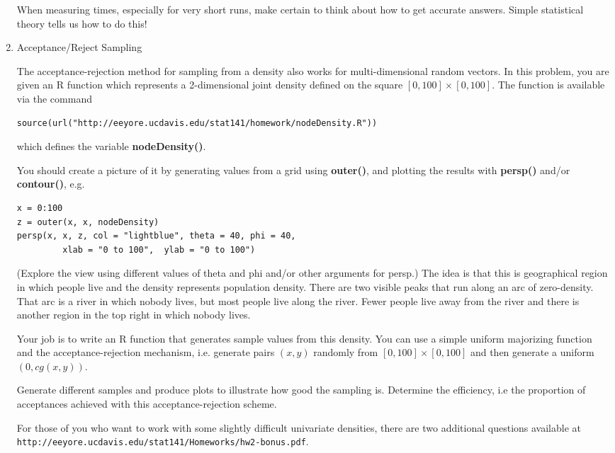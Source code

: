 \documentclass[11pt]{article}
\def\SFunction#1{\textbf{#1()}}
\begin{document}
\begin{enumerate}
 When measuring times, especially for very short runs, 
 make certain to think about how to get accurate answers.
 Simple statistical theory tells us how to do this!


\item Acceptance/Reject Sampling

  The acceptance-rejection method for sampling from a density also works 
  for multi-dimensional random vectors.  In this problem, you are
  given an R function which represents a 2-dimensional joint density
  defined on the square $[0, 100] \times [0, 100]$.  
  The function is available via the command
\begin{verbatim}
source(url("http://eeyore.ucdavis.edu/stat141/homework/nodeDensity.R"))
\end{verbatim}
 which defines the variable \SFunction{nodeDensity}.

 You should create a picture of it by generating values from a grid
 using \SFunction{outer}, and plotting the results with
 \SFunction{persp} and/or \SFunction{contour}, e.g.
\begin{verbatim}
x = 0:100
z = outer(x, x, nodeDensity)
persp(x, x, z, col = "lightblue", theta = 40, phi = 40,
         xlab = "0 to 100",  ylab = "0 to 100")
\end{verbatim}
 (Explore the view using different values of theta and phi
  and/or other arguments for persp.)
  The idea is that this is geographical region in which people live
  and the density represents population density.  There are two
  visible peaks that run along an arc of zero-density.  That arc is a
  river in which nobody lives, but most people live along the river.
  Fewer people live away from the river and there is another
  region in the top right in which nobody lives.

  Your job is to write an R function that generates sample values from
  this density.  You can use a simple uniform majorizing function and
  the acceptance-rejection mechanism, i.e. generate pairs $(x, y)$
  randomly from $[0, 100] \times [0, 100]$ and then generate a uniform
  $(0, c g(x, y))$.
 
  Generate different samples and produce plots to illustrate how good
  the sampling is.  Determine the efficiency, i.e the proportion of
  acceptances achieved with this acceptance-rejection scheme.


  For those of you who want to work with some slightly difficult
  univariate densities, there are two additional questions available
  at
  \texttt{http://eeyore.ucdavis.edu/stat141/Homeworks/hw2-bonus.pdf}.
     

\end{enumerate}
\end{document}
